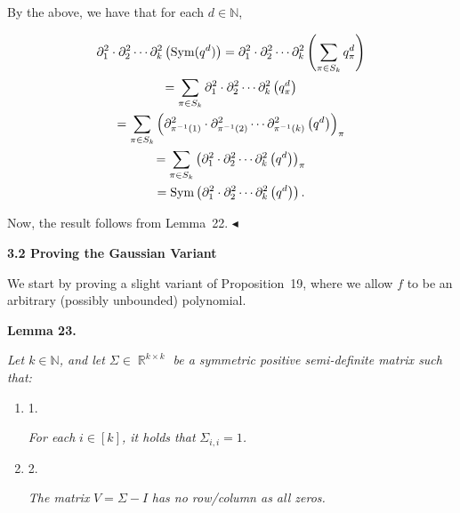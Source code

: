 \documentclass[10pt,a4paper]{article}
\begin{document}
By the above, we have that for each $d\in\mathbb{N}$,\par


\[\begin{gathered}
\displaystyle\partial_{1}^{2}\cdot\partial_{2}^{2}\cdots\partial_{k}^{2}\left(\textnormal{Sym}(q^{d})\right) \displaystyle=\partial_{1}^{2}\cdot\partial_{2}^{2}\cdots\partial_{k}^{2}\left(\sum_{\pi\in S_{k}}q_{\pi}^{d}\right) \\
\displaystyle=\sum_{\pi\in S_{k}}\partial_{1}^{2}\cdot\partial_{2}^{2}\cdots\partial_{k}^{2}\left(q_{\pi}^{d}\right) \\
\displaystyle=\sum_{\pi\in S_{k}}\left(\partial_{\pi^{-1}(1)}^{2}\cdot\partial_{\pi^{-1}(2)}^{2}\cdots\partial_{\pi^{-1}(k)}^{2}\left(q^{d}\right)\right)_{\pi} \\
\displaystyle=\sum_{\pi\in S_{k}}\left(\partial_{1}^{2}\cdot\partial_{2}^{2}\cdots\partial_{k}^{2}\left(q^{d}\right)\right)_{\pi} \\
\displaystyle=\textnormal{Sym}\left(\partial_{1}^{2}\cdot\partial_{2}^{2}\cdots\partial_{k}^{2}\left(q^{d}\right)\right).
\end{gathered}\]


Now, the result follows from Lemma 22.
$\blacktriangleleft$\par






\par\medskip\noindent\textbf{
3.2 Proving the Gaussian Variant}\par




We start by proving a slight variant of Proposition 19, where we allow $f$ to be an arbitrary (possibly unbounded) polynomial.\par





\par\medskip\noindent\textbf{
\textbf{Lemma 23}\textbf{.}
}\par



\emph{Let $k\in\mathbb{N}$, and let $\Sigma\in\mathop{\mathbb{R}}^{k\times k}$ be a symmetric positive semi-definite matrix such that:}\par


\begin{enumerate}


\item[] 
1. 


\emph{For each }$i\in[k]$\emph{, it holds that }$\Sigma_{i,i}=1$\emph{.}\par





\item[] 
2. 


\emph{The matrix }$V=\Sigma-I$\emph{ has no row/column as all zeros.}\par





\end{enumerate}
\end{document}

